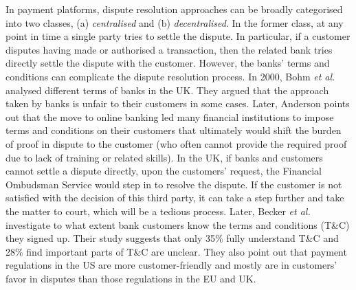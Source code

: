 In payment platforms,  dispute resolution approaches can be broadly categorised into two classes, (a) \emph{centralised} and (b) \emph{decentralised}. In the former class,  at any point in time a single party tries to settle the dispute. In particular, if a customer  disputes having made or authorised a transaction, then the related bank tries directly settle the dispute with the customer.  However, the banks' terms and conditions can complicate the dispute resolution process. In 2000, Bohm \textit{et al.} \cite{BohmBG00} analysed different terms of banks in the UK. They argued that the approach taken by banks is unfair to their customers in some cases. Later,  Anderson  \cite{anderson2007closing} points out that the move to online banking led many financial institutions to impose terms and conditions on their customers that ultimately would shift the burden of proof in dispute to the customer (who often cannot  provide the required proof due to lack of training or related skills). In the UK, if banks and customers cannot settle a dispute directly, upon the customers' request, the  Financial Ombudsman Service would step in to resolve the dispute. If the customer is  not satisfied with the decision of this third party, it can take a step further and take  the matter to court, which will be  a tedious process. Later,  Becker \textit{et al.} \cite{BeckerHAABMSS17} investigate to what extent bank customers know the terms and conditions (T\&C) they  signed up. Their study suggests that only 35\% fully understand T\&C and  28\% find important parts of T\&C are unclear. They also point out that  payment regulations in the US are more customer-friendly and mostly are in  customers' favor in disputes than those regulations in the EU and UK. 

